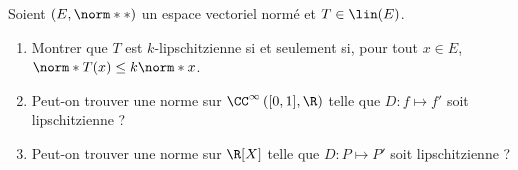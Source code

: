 \begin{enonce}
\begin{exercise}[ID={RMS 122 E951 Centrale PSI},subtitle={},tags={}]
  Soient $\left( E,\norm** \right)$ un espace vectoriel normé et $T\in\lin(E)$.
  \begin{enumerate}
    \item 
  Montrer que $T$ est $k$-lipschitzienne si et seulement si, pour tout $x\in E$, $\norm*{T(x)}\leq k\norm*x$.
\item 
  Peut-on trouver une norme sur $\CC^\infty\left( [0,1],\R \right)$ telle que $D:f\mapsto f'$ soit lipschitzienne ?
\item
  Peut-on trouver une norme sur $\R[X]$ telle que $D:P\mapsto P'$ soit lipschitzienne ?
  \end{enumerate}
\end{exercise}
\begin{solution}
\end{solution}
\end{enonce}
